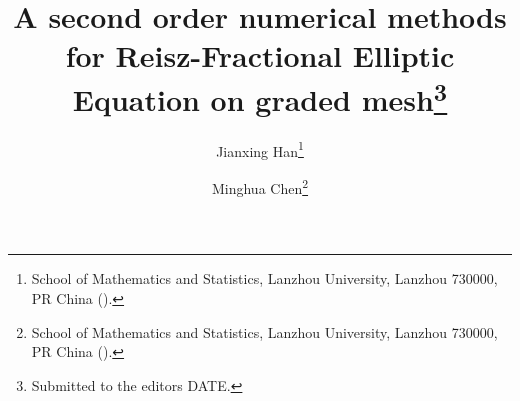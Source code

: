 

\usepackage{lipsum}
\usepackage{amsfonts}
\usepackage{graphicx}
\usepackage{epstopdf}
\usepackage{algorithmic}
\ifpdf
\else
\fi

\newcommand{\creflastconjunction}{, and~}



\title{A second order numerical methods for Reisz-Fractional Elliptic Equation on graded mesh\thanks{Submitted to the editors DATE.
}}

\author{Jianxing Han\thanks{School of Mathematics and Statistics, Lanzhou University, Lanzhou 730000, PR China
  ().}
  \and Minghua Chen\thanks{School of Mathematics and Statistics, Lanzhou University, Lanzhou 730000, PR China 
  ().}
}

\usepackage{amsopn}
\DeclareMathOperator{\diag}{diag}


